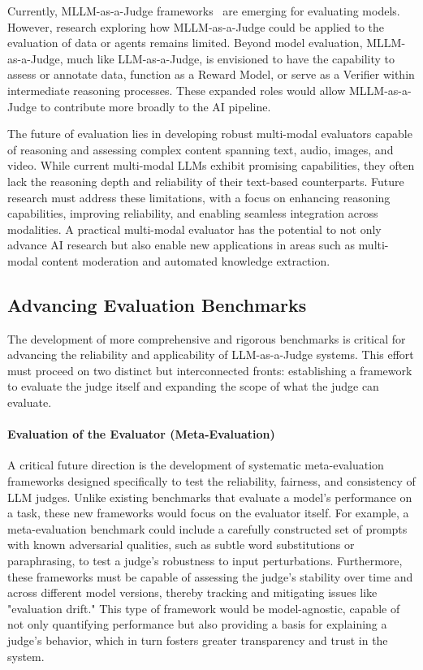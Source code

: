 Currently, MLLM-as-a-Judge frameworks~\cite{mllm-as-a-judge} are emerging for evaluating models. However, research exploring how MLLM-as-a-Judge could be applied to the evaluation of data or agents remains limited. Beyond model evaluation, MLLM-as-a-Judge, much like LLM-as-a-Judge, is envisioned to have the capability to assess or annotate data, function as a Reward Model, or serve as a Verifier within intermediate reasoning processes. These expanded roles would allow MLLM-as-a-Judge to contribute more broadly to the AI pipeline.

The future of evaluation lies in developing robust multi-modal evaluators capable of reasoning and assessing complex content spanning text, audio, images, and video. While current multi-modal LLMs exhibit promising capabilities, they often lack the reasoning depth and reliability of their text-based counterparts. Future research must address these limitations, with a focus on enhancing reasoning capabilities, improving reliability, and enabling seamless integration across modalities. A practical multi-modal evaluator has the potential to not only advance AI research but also enable new applications in areas such as multi-modal content moderation and automated knowledge extraction.


\subsection{Advancing Evaluation Benchmarks}\label{subsec:future_benchmarks}

The development of more comprehensive and rigorous benchmarks is critical for advancing the reliability and applicability of LLM-as-a-Judge systems. This effort must proceed on two distinct but interconnected fronts: establishing a framework to evaluate the judge itself and expanding the scope of what the judge can evaluate.

\paragraph{\textbf{Evaluation of the Evaluator (Meta-Evaluation)}}
A critical future direction is the development of systematic meta-evaluation frameworks designed specifically to test the reliability, fairness, and consistency of LLM judges. Unlike existing benchmarks that evaluate a model's performance on a task, these new frameworks would focus on the evaluator itself. For example, a meta-evaluation benchmark could include a carefully constructed set of prompts with known adversarial qualities, such as subtle word substitutions or paraphrasing, to test a judge's robustness to input perturbations. Furthermore, these frameworks must be capable of assessing the judge's stability over time and across different model versions, thereby tracking and mitigating issues like "evaluation drift." This type of framework would be model-agnostic, capable of not only quantifying performance but also providing a basis for explaining a judge's behavior, which in turn fosters greater transparency and trust in the system.

